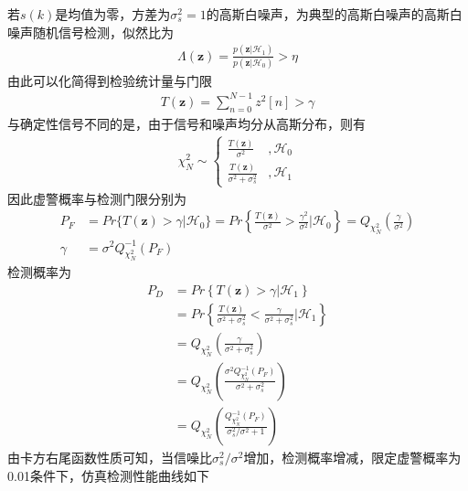 \documentclass[fontset=windows]{article}
\numberwithin{figure}{section}
\begin{document}
若\(s(k)\)是均值为零，方差为\(\sigma^2_s=1\)的高斯白噪声，为典型的高斯白噪声的高斯白噪声随机信号检测，似然比为
\begin{align*}
	\Lambda(\mathbf{z})=\frac{p(\mathbf{z}|\mathcal{H}_1)}{p(\mathbf{z}|\mathcal{H}_0)}>\eta
\end{align*}
由此可以化简得到检验统计量与门限
\begin{align*}
	T(\mathbf{z})=\sum_{n=0}^{N-1}z^2[n]>\gamma
\end{align*}
与确定性信号不同的是，由于信号和噪声均分从高斯分布，则有
\begin{align*}
	\chi^2_N\sim\left\{
	\begin{matrix}
		\frac{T(\mathbf{z})}{\sigma^2}            & , \mathcal{H}_0 \\
		\frac{T(\mathbf{z})}{\sigma^2+\sigma^2_s} & , \mathcal{H}_1
	\end{matrix}
	\right.
\end{align*}
因此虚警概率与检测门限分别为
\begin{align*}
	P_F    & =Pr\{T(\mathbf{z})>\gamma|\mathcal{H}_0\}=Pr\left\{ \frac{T(\mathbf{z})}{\sigma^2}>\frac{\gamma^2}{\sigma^2}|\mathcal{H}_0\right\}=Q_{\chi^2_N}(\frac{\gamma}{\sigma^2}) \\
	\gamma & =\sigma^2Q^{-1}_{\chi^2_N}(P_F)
\end{align*}
检测概率为
\begin{align*}
	P_D
	 & =Pr\left\{T(\mathbf{z})>\gamma|\mathcal{H}_1 \right\}                                                         \\
	 & =Pr\left\{\frac{T(\mathbf{z})}{\sigma^2+\sigma^2_s}<\frac{\gamma}{\sigma^2+\sigma^2_s} |\mathcal{H}_1\right\} \\
	 & =Q_{\chi^2_N}\left(\frac{\gamma}{\sigma^2+\sigma^2_s}\right)                                                  \\
	 & =Q_{\chi^2_N}\left(\frac{\sigma^2Q^{-1}_{\chi^2_N}(P_F)}{\sigma^2+\sigma^2_s}\right)                          \\
	 & =Q_{\chi^2_N}\left(\frac{Q^{-1}_{\chi^2_N}(P_F)}{\sigma^2_s/\sigma^2+1}\right)
\end{align*}
由卡方右尾函数性质可知，当信噪比\(\sigma^2_s/\sigma^2\)增加，检测概率增减，限定虚警概率为0.01条件下，仿真检测性能曲线如下
\end{document}
